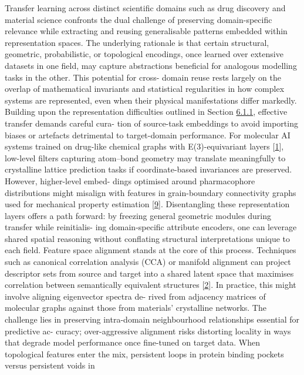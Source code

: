 \documentclass[
]{article}
\begin{document}
Transfer learning across distinct scientific domains such as drug
discovery and material science confronts the dual challenge of
preserving domain-specific relevance while extracting and reusing
generalisable patterns embedded within representation spaces. The
underlying rationale is that certain structural, geometric,
probabilistic, or topological encodings, once learned over extensive
datasets in one field, may capture abstractions beneficial for analogous
modelling tasks in the other. This potential for cross- domain reuse
rests largely on the overlap of mathematical invariants and statistical
regularities in how complex systems are represented, even when their
physical manifestations differ markedly. Building upon the
representation difficulties outlined in Section
\hyperref[shared-representation-challenges]{6.1.1}, effective transfer
demands careful cura- tion of source-task embeddings to avoid importing
biases or artefacts detrimental to target-domain performance. For
molecular AI systems trained on drug-like chemical graphs with
E(3)-equivariant layers {[}\hyperref[_bookmark41]{1}{]}, low-level
filters capturing atom--bond geometry may translate meaningfully to
crystalline lattice prediction tasks if coordinate-based invariances are
preserved. However, higher-level embed- dings optimised around
pharmacophore distributions might misalign with features in
grain-boundary connectivity graphs used for mechanical property
estimation {[}\hyperref[_bookmark49]{9}{]}. Disentangling these
representation layers offers a path forward: by freezing general
geometric modules during transfer while reinitialis- ing domain-specific
attribute encoders, one can leverage shared spatial reasoning without
conflating structural interpretations unique to each field. Feature
space alignment stands at the core of this process. Techniques such as
canonical correlation analysis (CCA) or manifold alignment can project
descriptor sets from source and target into a shared latent space that
maximises correlation between semantically equivalent structures
{[}\hyperref[_bookmark42]{2}{]}. In practice, this might involve
aligning eigenvector spectra de- rived from adjacency matrices of
molecular graphs against those from materials' crystalline networks. The
challenge lies in preserving intra-domain neighbourhood relationships
essential for predictive ac- curacy; over-aggressive alignment risks
distorting locality in ways that degrade model performance once
fine-tuned on target data. When topological features enter the mix,
persistent loops in protein binding pockets versus persistent voids in
\end{document}
